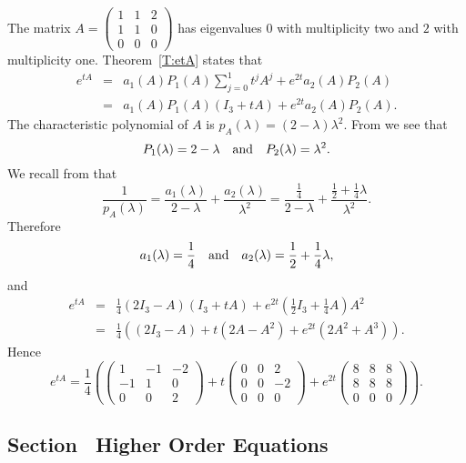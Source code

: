 \soln The matrix 
$A = \left(\begin{array}{rrr} 1 & 1 & 2\\ 1 & 1 & 0 \\ 0 & 0 & 0
\end{array}\right)$ has eigenvalues $0$ with multiplicity two and $2$ 
with multiplicity one. Theorem~\ref{T:etA} states that 
\begin{eqnarray*}
e^{tA} & = & a_1(A)P_1(A)\sum_{j=0}^1t^jA^j + e^{2t}a_2(A)P_2(A)\\
 & = & a_1(A)P_1(A)(I_3+tA) + e^{2t}a_2(A)P_2(A).
\end{eqnarray*}
The characteristic polynomial of $A$ is $p_A(\lambda) =(2-\lambda)\lambda^2$.
From  we see that
\[
P_1(\lambda) = 2-\lambda \quad\mbox{and}\quad P_2(\lambda) = \lambda^2.
\]
We recall from  that 
\[
\frac{1}{p_A(\lambda)} = \frac{a_1(\lambda)}{2-\lambda} + 
\frac{a_2(\lambda)}{\lambda^2} = \frac{\frac{1}{4}}{2-\lambda}
+ \frac{\frac{1}{2}+\frac{1}{4}\lambda}{\lambda^2}.
\]
Therefore
\[
a_1(\lambda) = \frac{1}{4} \quad\mbox{and}\quad a_2(\lambda) = \frac{1}{2}+\frac{1}{4}\lambda,
\]
and
\begin{eqnarray*}
e^{tA} & = & \frac{1}{4}(2I_3-A)(I_3+tA) + 
e^{2t}\left(\frac{1}{2}I_3+\frac{1}{4}A\right)A^2\\
& = & \frac{1}{4}\left((2I_3-A)+t(2A-A^2)+e^{2t}(2A^2+A^3)\right).
\end{eqnarray*}
Hence
\[
e^{tA}= \frac{1}{4}\left(\left(\begin{array}{rrr} 1 & -1 & -2\\ -1 & 1 & 0 
\\ 0 & 0 & 2\end{array}\right)+t\left(\begin{array}{rrr} 0 & 0 & 2\\ 0 & 0 & -2
\\ 0 & 0 & 0 \end{array}\right)+e^{2t}\left(\begin{array}{rrr} 8 & 8 & 8\\ 
8 & 8 & 8 \\ 0 & 0 & 0\end{array}\right)\right).
\]



\subsection*{Section~\protect{\ref{sec:HighOrder}} Higher Order Equations}

